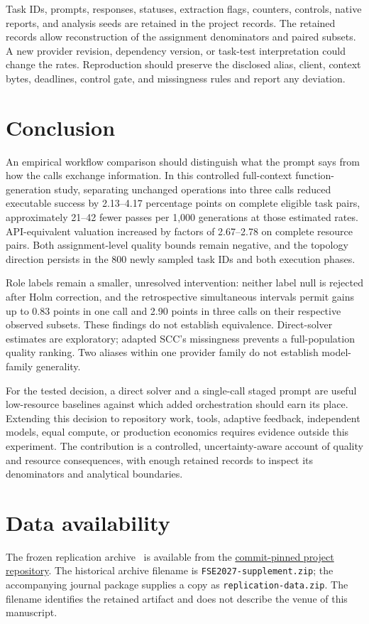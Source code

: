 Task IDs, prompts, responses, statuses, extraction flags, counters, controls, native reports, and analysis seeds are retained in the project records. The retained records allow reconstruction of the assignment denominators and paired subsets. A new provider revision, dependency version, or task-test interpretation could change the rates. Reproduction should preserve the disclosed alias, client, context bytes, deadlines, control gate, and missingness rules and report any deviation.

\section{Conclusion}
An empirical workflow comparison should distinguish what the prompt says from how the calls exchange information. In this controlled full-context function-generation study, separating unchanged operations into three calls reduced executable success by 2.13--4.17 percentage points on complete eligible task pairs, approximately 21--42 fewer passes per 1,000 generations at those estimated rates. API-equivalent valuation increased by factors of 2.67--2.78 on complete resource pairs. Both assignment-level quality bounds remain negative, and the topology direction persists in the 800 newly sampled task IDs and both execution phases.

Role labels remain a smaller, unresolved intervention: neither label null is rejected after Holm correction, and the retrospective simultaneous intervals permit gains up to 0.83 points in one call and 2.90 points in three calls on their respective observed subsets. These findings do not establish equivalence. Direct-solver estimates are exploratory; adapted SCC's missingness prevents a full-population quality ranking. Two aliases within one provider family do not establish model-family generality.

For the tested decision, a direct solver and a single-call staged prompt are useful low-resource baselines against which added orchestration should earn its place. Extending this decision to repository work, tools, adaptive feedback, independent models, equal compute, or production economics requires evidence outside this experiment. The contribution is a controlled, uncertainty-aware account of quality and resource consequences, with enough retained records to inspect its denominators and analytical boundaries.

\section*{Data availability}
The frozen replication archive~\cite{privezentsev2026rolecallsdata} is available from the \href{https://github.com/daniil-novel/article-INoT/raw/008b730a905277079710092ecf3881770eb100fc/submission/fse2027/upload/FSE2027-supplement.zip}{commit-pinned project repository}. The historical archive filename is \texttt{FSE2027-supplement.zip}; the accompanying journal package supplies a copy as \texttt{replication-data.zip}. The filename identifies the retained artifact and does not describe the venue of this manuscript.

